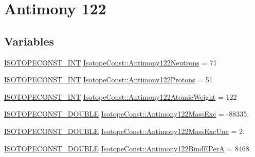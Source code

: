\hypertarget{group___isotope_const-_antimony-_sb122}{}\section{Antimony 122}
\label{group___isotope_const-_antimony-_sb122}
\subsection*{Variables}
\begin{DoxyCompactItemize}
\item 
\mbox{\hyperlink{group___isotope_const-_macros_ga5f18360b3e99483a35c32d789e62621c}{I\+S\+O\+T\+O\+P\+E\+C\+O\+N\+S\+T\+\_\+\+I\+NT}} \mbox{\hyperlink{group___isotope_const-_antimony-_sb122_ga960b2dd2c347ab19207ebaa3de54c2b0}{Isotope\+Const\+::\+Antimony122\+Neutrons}} = 71
\item 
\mbox{\hyperlink{group___isotope_const-_macros_ga5f18360b3e99483a35c32d789e62621c}{I\+S\+O\+T\+O\+P\+E\+C\+O\+N\+S\+T\+\_\+\+I\+NT}} \mbox{\hyperlink{group___isotope_const-_antimony-_sb122_ga5d9570a8b335579fd8fe4eebdd9edf25}{Isotope\+Const\+::\+Antimony122\+Protons}} = 51
\item 
\mbox{\hyperlink{group___isotope_const-_macros_ga5f18360b3e99483a35c32d789e62621c}{I\+S\+O\+T\+O\+P\+E\+C\+O\+N\+S\+T\+\_\+\+I\+NT}} \mbox{\hyperlink{group___isotope_const-_antimony-_sb122_gab8ea2325228a06c346d8ad34b144186f}{Isotope\+Const\+::\+Antimony122\+Atomic\+Weight}} = 122
\item 
\mbox{\hyperlink{group___isotope_const-_macros_ga8f45a7272ce02c0b4c65c44636ed719a}{I\+S\+O\+T\+O\+P\+E\+C\+O\+N\+S\+T\+\_\+\+D\+O\+U\+B\+LE}} \mbox{\hyperlink{group___isotope_const-_antimony-_sb122_ga0a094561c5a3a4f89823cbcf630319fe}{Isotope\+Const\+::\+Antimony122\+Mass\+Exc}} = -\/88335.
\item 
\mbox{\hyperlink{group___isotope_const-_macros_ga8f45a7272ce02c0b4c65c44636ed719a}{I\+S\+O\+T\+O\+P\+E\+C\+O\+N\+S\+T\+\_\+\+D\+O\+U\+B\+LE}} \mbox{\hyperlink{group___isotope_const-_antimony-_sb122_ga55a135883998b8d2dea4061f026810ab}{Isotope\+Const\+::\+Antimony122\+Mass\+Exc\+Unc}} = 2.
\item 
\mbox{\hyperlink{group___isotope_const-_macros_ga8f45a7272ce02c0b4c65c44636ed719a}{I\+S\+O\+T\+O\+P\+E\+C\+O\+N\+S\+T\+\_\+\+D\+O\+U\+B\+LE}} \mbox{\hyperlink{group___isotope_const-_antimony-_sb122_gabb0b32ce40d7cdbd489edeeb1c0b400c}{Isotope\+Const\+::\+Antimony122\+Bind\+E\+PerA}} = 8468.
\item 

\end{DoxyCompactItemize}
